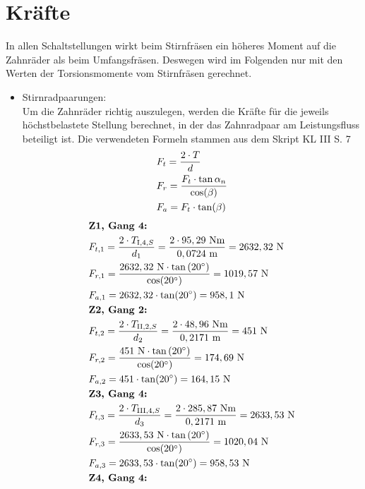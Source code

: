 \section{Kräfte}
In allen Schaltstellungen wirkt beim Stirnfräsen ein höheres Moment auf die Zahnräder als beim Umfangsfräsen. Deswegen wird im Folgenden nur mit den Werten der Torsionsmomente vom Stirnfräsen gerechnet. 
\begin{itemize}
\item Stirnradpaarungen: \\
Um die Zahnräder richtig auszulegen, werden die Kräfte für die jeweils höchstbelastete Stellung berechnet, in der das Zahnradpaar am Leistungsfluss beteiligt ist. 
Die verwendeten Formeln stammen aus dem Skript KL III S. 7
\begin{align*}
	&F_t = \frac{2\cdot T}{d} \\
	&F_r= \frac{F_t \cdot \tan{\alpha_n}}{\cos(\beta)} \\
	&F_a = F_t \cdot \tan(\beta) \\
\end{align*}
\begin{align*}
&\textbf{Z1, Gang 4:} \\
	&F_{t,1} = \frac{2\x T_{\mathrm{I},4,S}}{d_1} = \frac{2 \x 95,29 \text{ Nm}}{0,0724 \text{ m}} = 2632,32 \text{ N}\\ 
	&F_{r,1} = \frac{2632,32 \text{ N} \x \tan{(20^\circ)}}{\cos(20^\circ)} = 1019,57\text{ N}\\ 
	&F_{a,1} =2632,32 \x \tan(20^\circ) = 958,1 \text{ N}\\
&\textbf{Z2, Gang 2:} \\
	&F_{t,2} = \frac{2\x T_{\mathrm{II},2,S}}{d_2} = \frac{2 \x 48,96 \text{ Nm}}{0,2171 \text{ m}} =451 \text{ N}\\ 
	&F_{r,2} = \frac{451 \text{ N} \x \tan{(20^\circ)}}{\cos(20^\circ)} = 174,69\text{ N}\\ 
	&F_{a,2} = 451 \x \tan(20^\circ) = 164,15 \text{ N}\\	
&\textbf{Z3, Gang 4:} \\
	&F_{t,3} = \frac{2\x T_{\mathrm{III},4,S}}{d_3} = \frac{2 \x 285,87 \text{ Nm}}{0,2171 \text{ m}} = 2633,53 \text{ N}\\ 
	&F_{r,3} = \frac{2633,53 \text{ N} \x \tan{(20^\circ)}}{\cos(20^\circ)} = 1020,04\text{ N}\\ 
	&F_{a,3} = 2633,53 \x \tan(20^\circ) = 958,53 \text{ N}\\
&\textbf{Z4, Gang 4:} \\

\end{align*}
\end{itemize}
